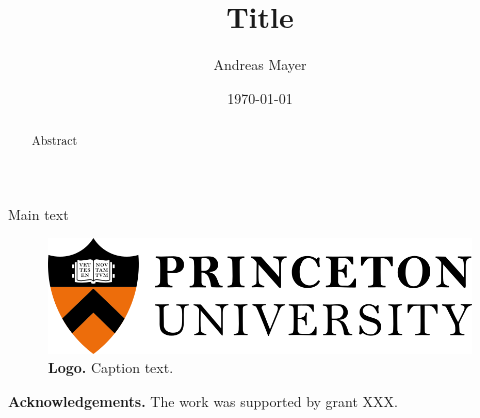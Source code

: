 \documentclass[superscriptaddress,twocolumn,pre]{revtex4}
\begin{document}
\title{Title}
\author{Andreas Mayer} 
\address{}
\date{\today}

\begin{abstract}
    Abstract
\end{abstract}

\maketitle


Main text


\begin{figure}
    \centering
    \includegraphics{princetonlogo}
    \caption{
        {\bf Logo.}
        Caption text.
    }
    \label{fig}
\end{figure}

{\bf Acknowledgements.}
The work was supported by grant XXX. 


\end{document}
